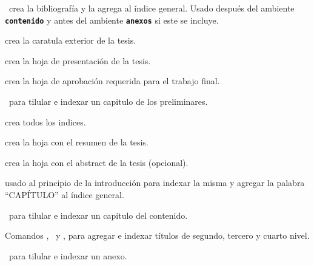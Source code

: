 
\pa\ crea la bibliografía y la agrega al índice general. Usado después del ambiente \texttt{\textbf{contenido}} y antes del ambiente \texttt{\textbf{anexos}} si este se incluye.


 crea la caratula exterior de la tesis.

 crea la hoja de presentación de la tesis.

 crea la hoja de aprobación requerida para el trabajo final.

\pa\ para tilular e indexar un capitulo de los preliminares.

 crea todos los indices.

 crea la hoja con el resumen de la tesis.

 crea la hoja con el abstract de la tesis (opcional).



 usado al principio de la introducción para indexar la misma y agregar la palabra ``CAPÍTULO'' al índice general.

\pa\ para tilular e indexar un capitulo del contenido.

Comandos \pa, \pa\ y \pa, para agregar e indexar títulos de segundo, tercero y cuarto nivel.



\pa\ para tilular e indexar un anexo.

